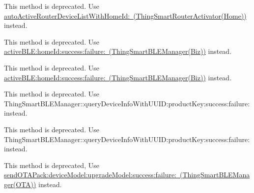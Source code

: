 \begin{DoxyRefList}
\label{deprecated__deprecated000090}%
%
This method is deprecated. Use \mbox{\hyperlink{category_thing_smart_router_activator_07_home_08_a912fa3f806b33e4f52ee04a5ac810273}{auto\+Active\+Router\+Device\+List\+With\+Home\+Id\+: (\+Thing\+Smart\+Router\+Activator(\+Home))}} instead.  
\item[(Biz) Member \mbox{\hyperlink{category_thing_smart_b_l_e_manager_07_biz_08_af8c413146cf6f3612fe9890344e8fd00}{\mbox{[}Thing\+Smart\+BLEManager(Biz) active\+BLEWith\+UUID\+:home\+Id\+:product\+Key\+:success\+:failure\+:\mbox{]}}} ]\label{deprecated__deprecated000160}%
%
This method is deprecated. Use \mbox{\hyperlink{category_thing_smart_b_l_e_manager_07_biz_08_a6fa4a361b6a4437f3d7bda7ae64f5ac6}{active\+BLE\+:home\+Id\+:success\+:failure\+: (\+Thing\+Smart\+BLEManager(\+Biz))}} instead. 

\label{deprecated__deprecated000165}%
%
This method is deprecated. Use \mbox{\hyperlink{category_thing_smart_b_l_e_manager_07_biz_08_a6fa4a361b6a4437f3d7bda7ae64f5ac6}{active\+BLE\+:home\+Id\+:success\+:failure\+: (\+Thing\+Smart\+BLEManager(\+Biz))}} instead.  
\item[(Biz) Member \mbox{\hyperlink{category_thing_smart_b_l_e_manager_07_biz_08_a29ac8543506916ade553aef0e0e0ed16}{\mbox{[}Thing\+Smart\+BLEManager(Biz) query\+Name\+With\+UUID\+:product\+Key\+:success\+:failure\+:\mbox{]}}} ]\label{deprecated__deprecated000166}%
%
This method is deprecated. Use Thing\+Smart\+BLEManager\+::query\+Device\+Info\+With\+UUID\+:product\+Key\+:success\+:failure\+: instead. 

\label{deprecated__deprecated000161}%
%
This method is deprecated. Use Thing\+Smart\+BLEManager\+::query\+Device\+Info\+With\+UUID\+:product\+Key\+:success\+:failure\+: instead.  
\item[(OTA) Member \mbox{\hyperlink{category_thing_smart_b_l_e_manager_07_o_t_a_08_aa4203d9992fcd2693ce1640e5e8fb2c8}{\mbox{[}Thing\+Smart\+BLEManager(OTA) send\+OTAPack\+:ota\+Data\+:success\+:failure\+:\mbox{]}}} ]\label{deprecated__deprecated000157}%
%
This method is deprecated, Use \mbox{\hyperlink{category_thing_smart_b_l_e_manager_07_o_t_a_08_a0ad37c54867c7353fed357ae1b494eae}{send\+OTAPack\+:device\+Model\+:upgrade\+Model\+:success\+:failure\+: (\+Thing\+Smart\+BLEManager(\+OTA))}} instead. 


\end{DoxyRefList}
